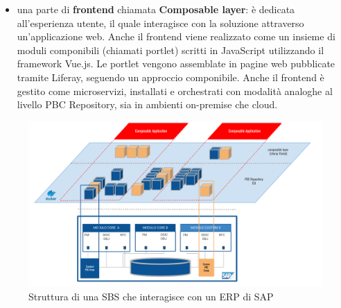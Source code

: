 \begin{itemize}
\begin{itemize}
            prezzi dei materiali PBC 0217 MATPRICELIST e l’unità di misura dei materiali PBC 0222 UNITOFMEASURE.
            In uno scenario on-premise (installazione presso il data-center del cliente), i
            microservizi sono orchestrati tramite Docker Compose. In uno scenario on-cloud, i
            microservizi vengono gestiti tramite Kubernetes\footnote{https://kubernetes.io}.
        \end{itemize}
    \item una parte di \textbf{frontend} chiamata \textbf{Composable layer}: è dedicata all’esperienza utente, il quale interagisce con
    la soluzione attraverso un'applicazione web.
    Anche il frontend viene realizzato come un insieme di moduli componibili (chiamati portlet)
    scritti in JavaScript utilizzando il framework Vue.js. Le portlet vengono assemblate in pagine web
    pubblicate tramite Liferay, seguendo un approccio componibile. Anche il frontend è gestito come
    microservizi, installati e orchestrati con modalità analoghe al livello \ac{PBC} Repository, sia in
    ambienti on-premise che cloud.
\end{itemize}

\begin{figure}
    \centering
    \includegraphics[width=\linewidth]{figures/architetturaSBS_SAP.pdf}
    \caption{Struttura di una \ac{SBS} che interagisce con un \ac{ERP} di SAP}
    \label{fig:sbs-sap}
\end{figure}


